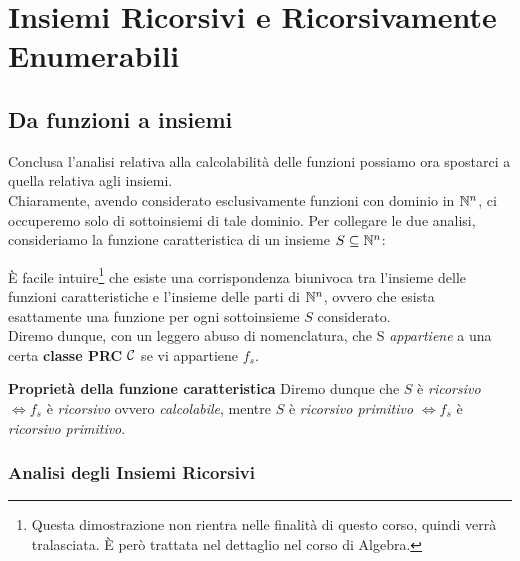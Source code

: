 \chapter{Insiemi Ricorsivi e Ricorsivamente Enumerabili}

\section{Da funzioni a insiemi}

Conclusa l'analisi relativa alla calcolabilità delle funzioni possiamo ora spostarci a quella relativa agli insiemi.\\
Chiaramente, avendo considerato esclusivamente funzioni con dominio in \(\mathbb{N}^n\), ci occuperemo solo di sottoinsiemi di tale dominio.
Per collegare le due analisi, consideriamo la funzione caratteristica di un insieme \(S\subseteq \mathbb{N}^n\):


È facile intuire\footnote{Questa dimostrazione non rientra nelle finalità di questo corso, quindi verrà tralasciata. È però trattata nel dettaglio nel corso di Algebra.} che esiste una corrispondenza biunivoca tra l'insieme delle funzioni caratteristiche e l'insieme delle parti di \(\mathbb{N}^n\), ovvero che esista esattamente una funzione per ogni sottoinsieme \(S\) considerato.\\

Diremo dunque, con un leggero abuso di nomenclatura,  che S \textit{appartiene} a una certa \textbf{classe PRC} \(\mathcal{C}\) se vi appartiene \(f_s\).

\textbf{Proprietà della funzione caratteristica}
Diremo dunque che \(S\) è \textit{ricorsivo} \(\iff f_s\) è \textit{ricorsivo} ovvero \textit{calcolabile}, mentre \(S\) è \textit{ricorsivo primitivo} \(\iff f_s\) è \textit{ricorsivo primitivo}.

\subsection{Analisi degli Insiemi Ricorsivi}

